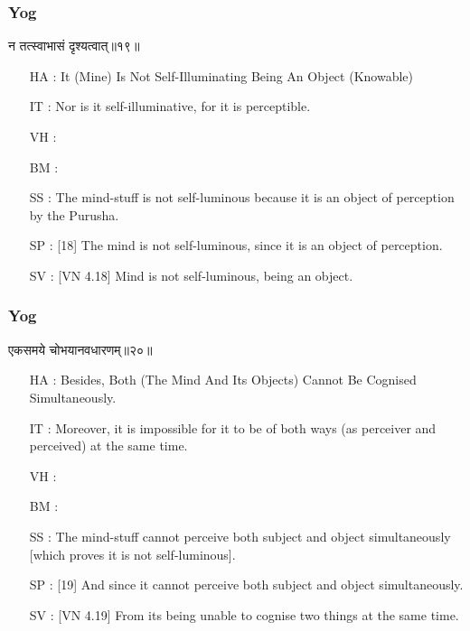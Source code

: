 \begin{frame}[fragile]\frametitle{Yog}
\begin{sanskrit}
न तत्स्वाभासं दृश्यत्वात्॥१९॥
\end{sanskrit}

	\begin{itemize}
	\item [HA]: It (Mine) Is Not Self-Illuminating Being An Object (Knowable)
	\item [IT]: Nor is it self-illuminative, for it is perceptible.
	\item [VH]: 
	\item [BM]: 
	\item [SS]: The mind-stuff is not self-luminous because it is an object of perception by the Purusha.
	\item [SP]: [18] The mind is not self-luminous, since it is an object of perception.
	\item [SV]: [VN 4.18] Mind is not self-luminous, being an object. 
	\end{itemize}
\end{frame}

\begin{frame}[fragile]\frametitle{Yog}
\begin{sanskrit}
एकसमये चोभयानवधारणम्॥२०॥
\end{sanskrit}

	\begin{itemize}
	\item [HA]: Besides, Both (The Mind And Its Objects) Cannot Be Cognised Simultaneously.
	\item [IT]: Moreover, it is impossible for it to be of both ways (as perceiver and perceived) at the same time.
	\item [VH]: 
	\item [BM]: 
	\item [SS]: The mind-stuff cannot perceive both subject and object simultaneously [which proves it is not self-luminous].
	\item [SP]: [19] And since it cannot perceive both subject and object simultaneously.
	\item [SV]: [VN 4.19] From its being unable to cognise two things at the same time. 
	\end{itemize}
\end{frame}



